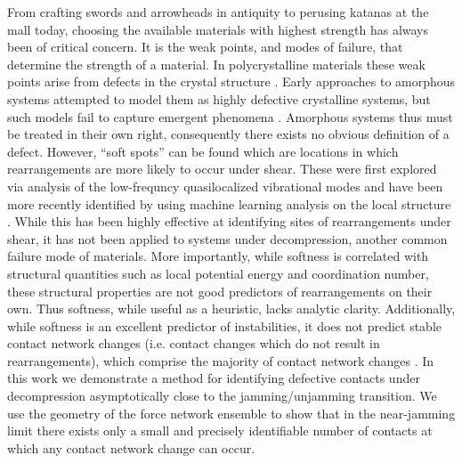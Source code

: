 From crafting swords and arrowheads in antiquity to perusing katanas at the mall today, choosing the available materials with highest strength has always been of critical concern. It is the weak points, and modes of failure, that determine the strength of a material. In polycrystalline materials these weak points arise from defects in the crystal structure \cite{taylor_mechanism_1934}. 
Early approaches to amorphous systems attempted to model them as highly defective crystalline systems, but such models fail to capture emergent phenomena \cite{goodrich_solids_2014}. Amorphous systems thus must be treated in their own right, consequently there exists no obvious definition of a defect. However, ``soft spots'' can be found which are locations in which rearrangements are more likely to occur under shear. These were first explored via analysis of the low-frequncy quasilocalized vibrational modes \cite{manning_vibrational_2011} and have been more recently identified by using machine learning analysis on the local structure \cite{cubuk_identifying_2015, cubuk_structural_2016, ding_soft_2014, wijtmans_disentangling_2017,schoenholz_structural_2016,schoenholz_understanding_2014,richard_predicting_2020,rocks_learning-based_2021,ridout_correlation_2020}.
While this has been highly effective at identifying sites of rearrangements under shear, it has not been applied to systems under decompression, another common failure mode of materials. More importantly, while softness is correlated with structural quantities such as local potential energy and coordination number, these structural properties are not good predictors of rearrangements on their own. Thus softness, while useful as a heuristic, lacks analytic clarity. Additionally, while softness is an excellent predictor of instabilities, it does not predict stable contact network changes (i.e. contact changes which do not result in rearrangements), which comprise the majority of contact network changes \cite{morse_differences_2020,tuckman_contact_2020}. In this work we demonstrate a method for identifying defective contacts under decompression asymptotically close to the jamming/unjamming transition. We use the geometry of the force network ensemble to show that in the near-jamming limit there exists only a small and precisely identifiable number of contacts at which any contact network change can occur.

